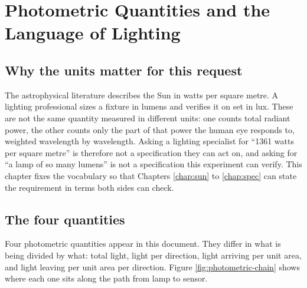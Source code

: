 \chapter{Photometric Quantities and the Language of Lighting}
\label{chap:units}

\section{Why the units matter for this request}

The astrophysical literature describes the Sun in watts per square metre. A lighting professional sizes a fixture in lumens and verifies it on set in lux. These are not the same quantity measured in different units: one counts total radiant power, the other counts only the part of that power the human eye responds to, weighted wavelength by wavelength. Asking a lighting specialist for ``1361 watts per square metre'' is therefore not a specification they can act on, and asking for ``a lamp of so many lumens'' is not a specification this experiment can verify. This chapter fixes the vocabulary so that Chapters \ref{chap:sun} to \ref{chap:spec} can state the requirement in terms both sides can check.

\section{The four quantities}

Four photometric quantities appear in this document. They differ in what is being divided by what: total light, light per direction, light arriving per unit area, and light leaving per unit area per direction. Figure \ref{fig:photometric-chain} shows where each one sits along the path from lamp to sensor.

